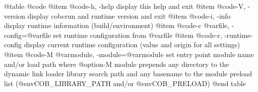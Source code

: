 @table @code
@item @code{-h, -help}
display this help and exit
@item @code{-V, -version}
display cobcrun and runtime version and exit
@item @code{-i, -info}
display runtime information (build/environment)
@item @code{-c @var{file}, -config=@var{file}}
set runtime configuration from @var{file}
@item @code{-r, -runtime-config}
display current runtime configuration
(value and origin for all settings)
@item @code{-M @var{module}, -module=@var{module}}
set entry point module name and/or load path
where @option{-M} module prepends any directory to the
dynamic link loader library search path
and any basename to the module preload list
(@env{COB_LIBRARY_PATH} and/or @env{COB_PRELOAD})
@end table
